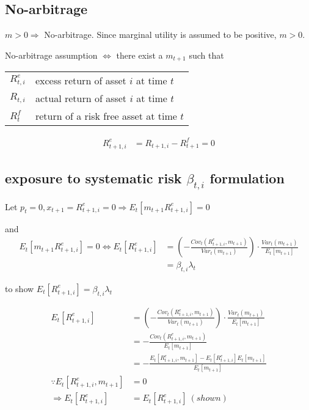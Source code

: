 \documentclass[11pt, oneside]{article}   	%
\begin{document}
\subsection{No-arbitrage}

$m > 0 \Rightarrow$ No-arbitrage. Since marginal utility is assumed to be positive, $m > 0$.

No-arbitrage assumption $\Leftrightarrow$ there exist a $m_{t+1}$ such that

\begin{tabular}{l @{ := } l}
    $R^e_{t,i}$ & excess return of asset $i$ at time $t$ \\
    $R_{t,i}$ & actual return of asset $i$ at time $t$ \\
    $R^f_t$ & return of a risk free asset at time $t$
\end{tabular}

\begin{align*}
    R^e_{t+1, i} &= R_{t+1, i} - R^f_{t+1} = 0
\end{align*}

\subsection{exposure to systematic risk $\beta_{t, i}$ formulation}

Let $p_t = 0, x_{t+1} = R^e_{t+1, i} = 0 \Rightarrow E_t\left[ m_{t+1}R^e_{t+1, i}  \right] =0$

and
\begin{align*}
    E_t\left[ m_{t+1}R^e_{t+1, i}  \right] = 0 \Leftrightarrow E_t\left[ R^e_{t+1,i}  \right] 
    &= \left( - \frac{Cov_t(R^e_{t+1, i}, m_{t+1} )}{Var_t(m_{t+1})}  \right) \cdot \frac{Var_t(m_{t+1})}{E_t\left[ m_{t+1}  \right]} \\
    &= \beta_{t,i}\lambda_t
\end{align*}

to show $E_t\left[ R^e_{t+1, i}  \right] = \beta_{t, i}\lambda_t$

\begin{align*}
    E_t\left[ R^e_{t+1,i}  \right] &=
    \left( - \frac{Cov_t(R^e_{t+1, i}, m_{t+1} )}{Var_t(m_{t+1})}  \right) \cdot \frac{Var_t(m_{t+1})}{E_t\left[ m_{t+1}
    \right]} \\
                                   &= - \frac{Cov_t(R^e_{t+1, i}, m_{t+1})}{E_t\left[ m_{t+1}  \right]} \\
                                   &= - \frac{E_t\left[ R^e_{t+1, i}, m_{t+1}  \right] - E_t\left[ R^e_{t+1, i}
                                   \right]E_t\left[ m_{t+1}  \right]}{E_t\left[ m_{t+1}  \right]} \\
    \because E_t\left[ R^e_{t+1, i}, m_{t+1}  \right] &= 0 \\
    \Rightarrow E_t\left[ R^e_{t+1, i}  \right] &= E_t \left[ R^e_{t+1, i}  \right]~(shown)
\end{align*}
\end{document}
